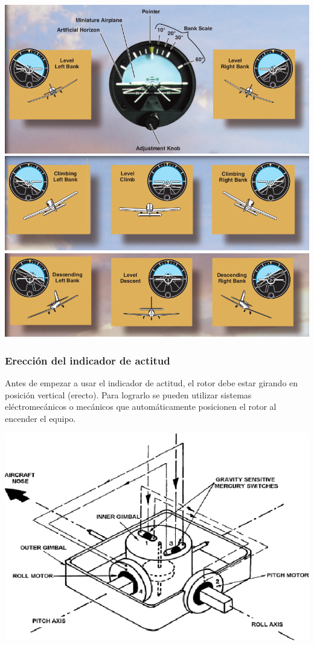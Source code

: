 \documentclass{article}
\begin{document}
\begin{center}
\includegraphics[scale=0.39]{figuras/ha}
\includegraphics[scale=0.39]{figuras/ha-1}
\includegraphics[scale=0.39]{figuras/ha-2}

\end{center}


\subsubsection*{Erección del indicador de actitud}
Antes de empezar a usar el indicador de actitud, el rotor debe estar girando en posición vertical (erecto). Para lograrlo se pueden utilizar sistemas eléctromecánicos o mecánicos que automáticamente posicionen el rotor al encender el equipo. 
\begin{center}
\includegraphics[scale=1.99]{figuras/horizonte-artificial-funcionamiento-2}
\label{fig:SAI}
\end{center}
\end{document}
